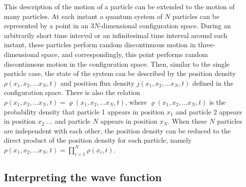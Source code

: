 This description of the motion of a particle can be extended to the motion of many particles. At each instant a quantum system of $N$ particles can be represented by a point in an $3N$-dimensional configuration space.
During an arbitrarily short time interval or an infinitesimal time interval around each instant, these particles perform random discontinuous motion in three-dimensional space, and correspondingly, this point performs random discontinuous motion in the configuration space. 
Then, similar to the single particle case, the state of the system can be described by the position density $\rho(x_1,x_2,...x_N,t)$ and position flux density $j(x_1,x_2,...x_N,t)$ defined in the configuration space. There is also the relation $\rho(x_1,x_2,...x_N,t)=\varrho(x_1,x_2,...x_N,t)$, where $\varrho(x_1,x_2,...x_N,t)$ is the probability density that particle 1 appears in position $x_1$ and particle 2 appears in position $x_2$ ... and particle $N$ appears in position $x_N$. When these $N$ particles are independent with each other, the position density can be reduced to the direct product of the position density for each particle, namely $\rho(x_1,x_2,...x_N,t)=\prod_{i=1}^N\rho(x_i,t)$. 

\subsection{Interpreting the wave function}

